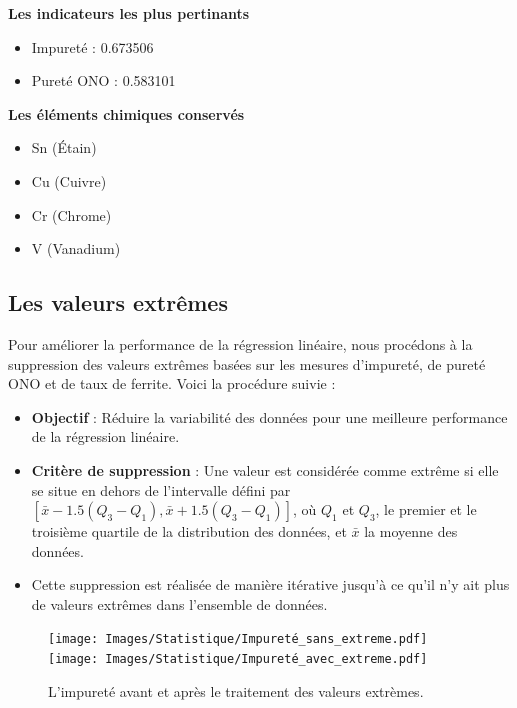 \documentclass[12pt]{article}
\begin{document}


\textbf{Les indicateurs les plus pertinants}
\begin{itemize}
\item Impureté : 0.673506
\item Pureté ONO : 0.583101
\end{itemize}

\textbf{Les éléments chimiques conservés}
\begin{itemize}
\item Sn (Étain) 
\item Cu (Cuivre)
\item Cr (Chrome) 
\item V (Vanadium)
\end{itemize}






\subsection{Les valeurs extrêmes}



Pour améliorer la performance de la régression linéaire, nous procédons à la suppression des valeurs extrêmes basées sur les mesures d'impureté, de pureté ONO et de taux de ferrite. Voici la procédure suivie :

\begin{itemize}
    \item \textbf{Objectif} : Réduire la variabilité des données pour une meilleure performance de la régression linéaire.
    \item \textbf{Critère de suppression } : Une valeur est considérée comme extrême si elle se situe en dehors de l'intervalle défini par $[\bar{x} - 1.5(Q_3 - Q_1), \bar{x} + 1.5(Q_3 - Q_1)]$, où $Q_1$ et $Q_3$, le premier et le troisième quartile de la distribution des données, et $\bar{x}$ la moyenne des données.
    \item Cette suppression est réalisée de manière itérative jusqu'à ce qu'il n'y ait plus de valeurs extrêmes dans l'ensemble de données.
\end{itemize}



\begin{figure}[H]
    \centering
    \begin{adjustbox}{width=1.3\textwidth,center}
        \texttt{[image: Images/Statistique/Impureté\_sans\_extreme.pdf]}
        \texttt{[image: Images/Statistique/Impureté\_avec\_extreme.pdf]}
    \end{adjustbox}
    \caption{L'impureté avant et après le traitement des valeurs extrèmes.}
    \label{fig:ExtremeImputerete}
\end{figure}
\end{document}
